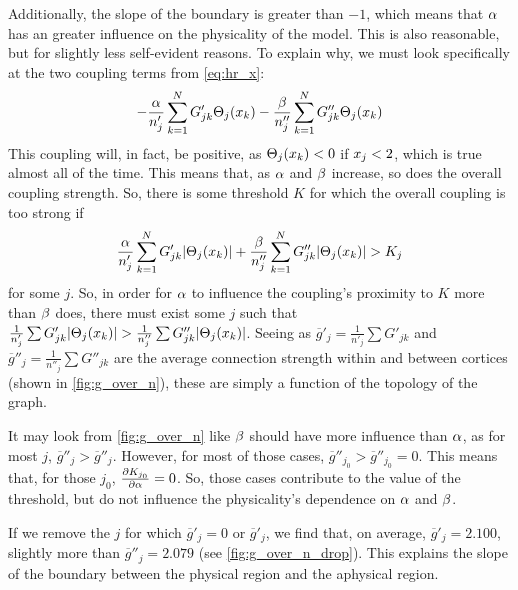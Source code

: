 Additionally, the slope of the boundary is greater than $-1$, which means that $\alpha$ has an greater influence on the physicality of the model.
This is also reasonable, but for slightly less self-evident reasons.
To explain why, we must look specifically at the two coupling terms from \cref{eq:hr_x}:
\[
  -\frac{\hra}{n'_{j}} \sum_{k = 1}^{N} G'_{j k} \Theta_{j}\pqty{\hrx_{k}}
  -
  \frac{\hrb}{n''_{j}} \sum_{k = 1}^{N} G''_{j k} \Theta_{j}\pqty{\hrx_{k}}
\]
This coupling will, in fact, be positive, as $\Theta_{j}\pqty{\hrx_{k}} < 0$ if $x_{j} < 2$, which is true almost all of the time.
This means that, as $\alpha$ and $\beta$ increase, so does the overall coupling strength.
So, there is some threshold $K$ for which the overall coupling is too strong if
\begin{equation}
  \label{eq:coupling_inequality}
  \frac{\hra}{n'_{j}} \sum_{k = 1}^{N} G'_{j k} \abs{\Theta_{j}\pqty{\hrx_{k}}}
  +
  \frac{\hrb}{n''_{j}} \sum_{k = 1}^{N} G''_{j k} \abs{\Theta_{j}\pqty{\hrx_{k}}}
  >
  K_{j}
\end{equation}
for some $j$.
So, in order for $\alpha$ to influence the coupling's proximity to $K$ more than $\beta$ does, there must exist some $j$ such that
$\frac{1}{n'_{j}} \sum G'_{j k} \abs{\Theta_{j}\pqty{\hrx_{k}}}
>
\frac{1}{n''_{j}} \sum G''_{j k} \abs{\Theta_{j}\pqty{\hrx_{k}}}$.
Seeing as $\overline{g}'_{j} = \frac{1}{n'_{j}} \sum G'_{j k}$ and $\overline{g}''_{j} = \frac{1}{n''_{j}} \sum G''_{j k}$ are the average connection strength within and between cortices (shown in \cref{fig:g_over_n}), these are simply a function of the topology of the graph.

It may look from \cref{fig:g_over_n} like $\beta$ should have more influence than $\alpha$, as for most $j$, $\overline{g}''_{j} > \overline{g}''_{j}$.
However, for most of those cases, $\overline{g}''_{j_{0}} > \overline{g}''_{j_{0}} = 0$.
This means that, for those $j_{0}$, $\pdv{K_{j_{0}}}{\alpha} = 0$.
So, those cases contribute to the value of the threshold, but do not influence the physicality's dependence on $\alpha$ and $\beta$.

If we remove the $j$ for which $\overline{g}'_{j} = 0$ or $\overline{g}'_{j}$, we find that, on average, $\overline{g}'_{j} = 2.100$, slightly more than $\overline{g}''_{j} = 2.079$ (see \cref{fig:g_over_n_drop}).
This explains the slope of the boundary between the physical region and the aphysical region.


